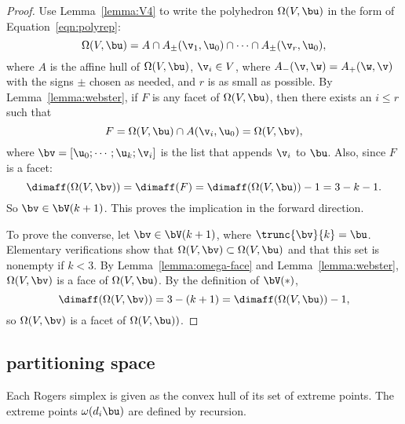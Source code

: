 \begin{proof} 
  Use Lemma~\ref{lemma:V4} to write the polyhedron $\Omega(V,\bu)$ in
  the form of Equation~\ref{eqn:polyrep}:
\begin{displaymath} 
\Omega(V,\bu) = A \cap A_\pm(\v_1,\u_0) \cap \cdots\cap A_\pm(\v_r,\u_0),
\end{displaymath}
where $A$ is the affine hull of $\Omega(V,\bu)$, $\v_i\in V$, where
$A_-(\v,\w) = A_+(\w,\v)$ with the signs $\pm$ chosen as needed, and
$r$ is as small as possible.  By Lemma~\ref{lemma:webster}, if $F$ is
any facet of $\Omega(V,\bu)$, then there exists an $i\le r$ such that
\begin{displaymath} 
F = \Omega(V,\bu) \cap A(\v_i,\u_0) = \Omega(V,\bv),
\end{displaymath}
where $\bv = [\u_0;\cdots;\u_k;\v_i]$ is the list that appends $\v_i$ to $\bu$.
Also, since $F$ is a facet:
\begin{displaymath} 
\dimaff(\Omega(V,\bv)) = \dimaff(F) = \dimaff(\Omega(V,\bu)) - 1 = 3 - k - 1.
\end{displaymath}
So $\bv \in \bV(k+1)$.  This proves the implication in the forward direction.

To prove the converse, let $\bv\in \bV(k+1)$, where $\trunc{\bv}{k} =
\bu$.  Elementary verifications show that $\Omega(V,\bv)\subset
\Omega(V,\bu)$ and that this set is nonempty if $k<3$.  By
Lemma~\ref{lemma:omega-face} and Lemma~\ref{lemma:webster},
$\Omega(V,\bv)$ is a face of $\Omega(V,\bu)$.  By the definition of
$\bV(*)$,
\begin{displaymath} 
\dimaff(\Omega(V,\bv)) = 3 - (k+1) = \dimaff(\Omega(V,\bu)) -1,
\end{displaymath}
so $\Omega(V,\bv)$ is a facet of $\Omega(V,\bu))$.
\end{proof}


\subsection{partitioning space}

Each Rogers simplex is given as the convex hull of  its set of extreme points.  
The extreme points $\omega(d_i\bu)$
are defined by recursion.

